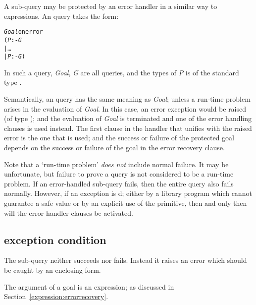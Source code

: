 A sub-query may be protected by an error handler in a similar way to expressions. An  query takes the form:

\begin{alltt}
\emph{Goal} onerror
 (\emph{P} :- \emph{G}
 | \ldots{}
 | \emph{P\subn} :- \emph{G\subn})
\end{alltt}
In such a query, \emph{Goal}, \emph{G\subi} are all queries, and the types of \emph{P\subi} is of the standard type .

Semantically, an  query has the same meaning as \emph{Goal}; unless a run-time problem arises in the evaluation of \emph{Goal}. In this case, an error exception would be raised (of type ); and the evaluation of \emph{Goal} is terminated and one of the error handling clauses is used instead. The first clause in the handler that unifies with the raised error is the one that is used; and the success or failure of the protected goal depends on the success or failure of the goal in the error recovery clause.

Note that a `run-time problem' \emph{does not} include normal failure. It may be unfortunate, but failure to prove a query is not considered to be a run-time problem. If an error-handled sub-query fails, then the entire query also fails normally. However, if an exception is d; either by a library program which cannot guarantee a safe value or by an explicit use of the  primitive, then and only then will the error handler clauses be activated.

\subsection{ exception condition}
\label{goal:special:exception}

The  sub-query neither succeeds nor fails. Instead it raises an error which should be caught by an enclosing  form.

The argument of a  goal is an  expression; as discussed in Section~\vref{expression:errorrecovery}.
